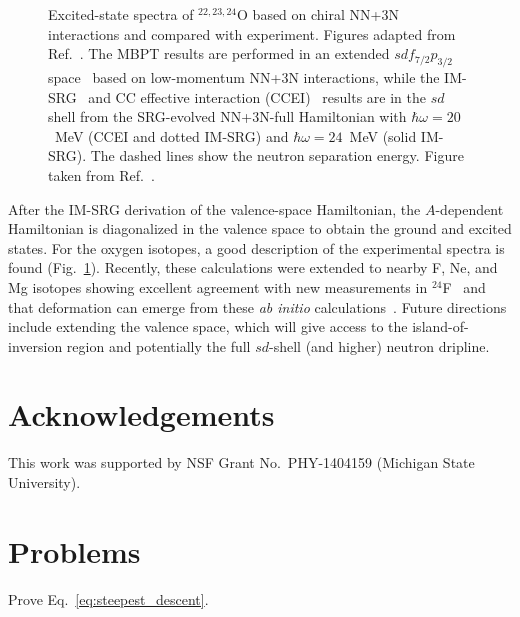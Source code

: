 \begin{figure}[t]
\begin{center}
\end{center}
\caption{Excited-state spectra of $^{22,23,24}$O based on chiral NN+3N
interactions and compared with experiment. Figures adapted from
Ref.~\cite{Bogner:2014tg}. The MBPT results are performed in an extended
$sdf_{7/2}p_{3/2}$ space~\cite{Holt:2013fk} based on low-momentum NN+3N
interactions, while the IM-SRG~\cite{Bogner:2014tg} and CC effective
interaction (CCEI)~\cite{Jansen:2014qf} results are in the $sd$ shell from
the SRG-evolved NN+3N-full Hamiltonian with $\hbar \omega=20$~MeV
(CCEI and dotted IM-SRG) and $\hbar \omega=24$~MeV (solid IM-SRG). The
dashed lines show the neutron separation energy.
Figure taken from Ref.~\cite{Hebeler:2015xq}.\label{fig:Ospectra}}
\end{figure}

After the IM-SRG derivation of the valence-space Hamiltonian, the
$A$-dependent Hamiltonian is diagonalized in the valence space to
obtain the ground and excited states. For the oxygen isotopes, a good
description of the experimental spectra is found
(Fig.~\ref{fig:Ospectra}).  Recently, these calculations were extended
to nearby F, Ne, and Mg isotopes showing excellent agreement with new
measurements in $^{24}$F~\cite{Caceres:2015fk} and that deformation
can emerge from these \emph{ab initio}
calculations~\cite{Stroberg:2015qr}. Future directions include
extending the valence space, which will give access to the
island-of-inversion region and potentially the full $sd$-shell (and
higher) neutron dripline.



\section{Acknowledgements}
This work was supported by NSF Grant No.~PHY-1404159 (Michigan State University).


\section{Problems}
\begin{prob}\label{problem:steepest_descent}
  Prove Eq.~\eqref{eq:steepest_descent}.
\end{prob}

